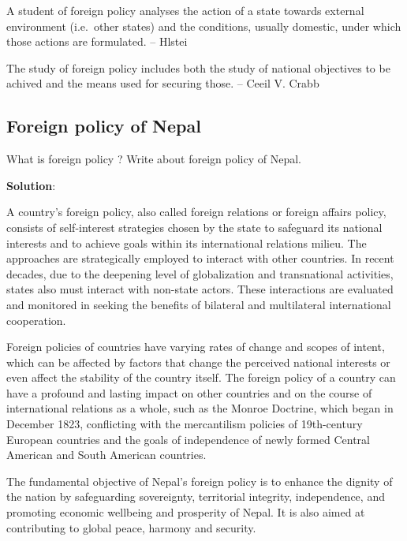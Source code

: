 \documentclass[
  openany]{book}
\newcommand{\question}{\item}
\newenvironment{solution}{ {\bfseries Solution}:}{}
\begin{document}
A student of foreign policy analyses the action of a state towards external environment (i.e.~other states) and the conditions, usually domestic, under which those actions are formulated. -- Hlstei

The study of foreign policy includes both the study of national objectives to be achived and the means used for securing those. -- Ceeil V. Crabb

\hypertarget{foreign-policy-of-nepal}{%
\subsection{Foreign policy of Nepal}\label{foreign-policy-of-nepal}}

\begin{questions}

\question What is foreign policy ? Write about foreign policy of Nepal.

\begin{solution}

A country's foreign policy, also called foreign relations or foreign affairs policy, consists of self-interest strategies chosen by the state to safeguard its national interests and to achieve goals within its international relations milieu. The approaches are strategically employed to interact with other countries. In recent decades, due to the deepening level of globalization and transnational activities, states also must interact with non-state actors. These interactions are evaluated and monitored in seeking the benefits of bilateral and multilateral international cooperation. 

Foreign policies of countries have varying rates of change and scopes of intent, which can be affected by factors that change the perceived national interests or even affect the stability of the country itself. The foreign policy of a country can have a profound and lasting impact on other countries and on the course of international relations as a whole, such as the Monroe Doctrine, which began in December 1823, conflicting with the mercantilism policies of 19th-century European countries and the goals of independence of newly formed Central American and South American countries.

The fundamental objective of Nepal's foreign policy is to enhance the dignity of the nation by safeguarding sovereignty, territorial integrity, independence, and promoting economic wellbeing and prosperity of Nepal. It is also aimed at contributing to global peace, harmony and security.


\end{solution}
\end{questions}
\end{document}
